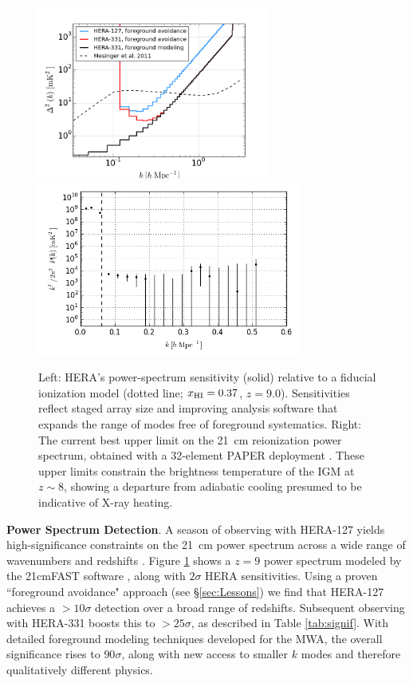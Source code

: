 \documentclass[preprint]{aastex}
\def\HI{{H{\small I }}}
\def\xHI{{x_{\rm\HI}}}
\begin{document}
\begin{figure}[t]\centering
\includegraphics[height=2.25in]{plots/Pspec/eor_pspec_2014.png}
\includegraphics[height=2.25in]{plots/Pspec/pk_k3pk.png} %
\caption{\small Left: HERA's power-spectrum sensitivity (solid)
relative to a fiducial ionization model (dotted line; $\xHI=0.37$, $z=9.0$).
Sensitivities reflect staged array size and
improving analysis software that expands the range
of modes free of foreground systematics.
Right: The current best upper limit on the 21~cm reionization power spectrum,
obtained with a 32-element PAPER deployment \citep{parsons_et_al2013}.  These upper limits
constrain the brightness temperature of the IGM at $z\sim8$, showing
a departure from adiabatic cooling presumed to be indicative of X-ray heating.
}\label{fig:eor_pspec}
\end{figure}

{\bf Power Spectrum Detection}. A season of observing with HERA-127 yields high-significance constraints on the 21~cm power
spectrum across a wide range of wavenumbers and redshifts \citep{pober_et_al2014}.  
Figure \ref{fig:eor_pspec} shows a $z=9$ power spectrum modeled by the 21cmFAST software \citep{mesinger_et_al2011},
along with $2\sigma$ HERA sensitivities.  Using a proven ``foreground avoidance" approach (see \S\ref{sec:Lessons})
we find that
HERA-127 achieves a $> 10\sigma$ detection over a broad range of redshifts.
Subsequent observing with HERA-331 boosts this to $>25\sigma$, as described in Table \ref{tab:signif}.  With detailed foreground modeling techniques
developed for the MWA, the overall significance rises to $90\sigma$,
along with new access to smaller $k$ modes and therefore qualitatively different physics.
\end{document}
